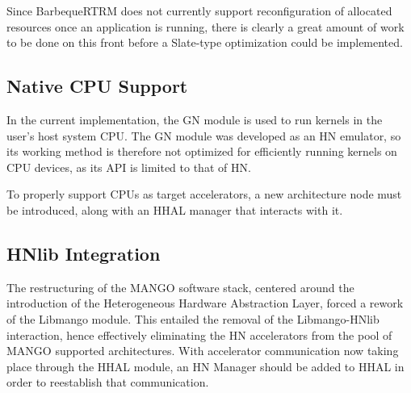 Since BarbequeRTRM does not currently support reconfiguration of allocated resources once an application is running, there is clearly a great amount of work to be done on this front before a Slate-type optimization could be implemented.

\subsection{Native CPU Support}

In the current implementation, the GN module is used to run kernels in the user's host system CPU. The GN module was developed as an HN emulator, so its working method is therefore not optimized for efficiently running kernels on CPU devices, as its API is limited to that of HN.

To properly support CPUs as target accelerators, a new architecture node must be introduced, along with an HHAL manager that interacts with it.

\subsection{HNlib Integration}

The restructuring of the MANGO software stack, centered around the introduction of the Heterogeneous Hardware Abstraction Layer, forced a rework of the Libmango module. This entailed the removal of the Libmango-HNlib interaction, hence effectively eliminating the HN accelerators from the pool of MANGO supported architectures.
With accelerator communication now taking place through the HHAL module, an HN Manager should be added to HHAL in order to reestablish that communication.

